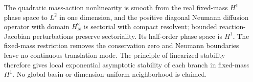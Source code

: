 The quadratic mass-action nonlinearity is smooth from the real fixed-mass
$H^1$ phase space to $L^2$ in one dimension, and the positive diagonal
Neumann diffusion operator with domain $H_N^2$ is sectorial with compact
resolvent; bounded reaction-Jacobian perturbations preserve sectoriality.  Its
half-order phase space is $H^1$.  The fixed-mass restriction removes
the conservation zero and Neumann boundaries leave no continuous translation
mode.  The principle of linearized stability therefore gives local exponential
asymptotic stability of each branch in fixed-mass $H^1$.  No global basin or
dimension-uniform neighborhood is claimed.
